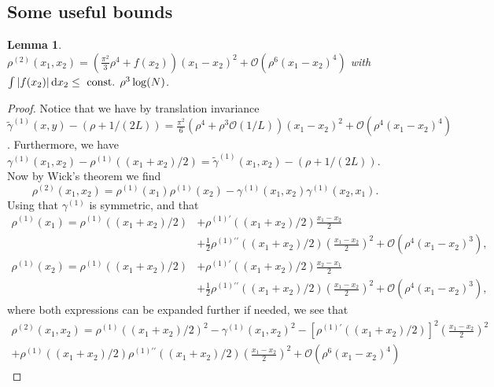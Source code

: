 \documentclass[a4paper,11pt]{article}
\newcommand{\abs}[1]{\left\lvert #1 \right\rvert}
\newcommand*\diff{\mathop{}\!\mathrm{d}}
\newtheorem{lemma}[theorem]{Lemma}
\numberwithin{equation}{section}
\begin{document}
	\subsection{Some useful bounds}
	\begin{lemma}\label{Lemma rho2 bound}
		$ \rho^{(2)}(x_1,x_2)=\left(\frac{\pi^2}{3}\rho^4+f(x_2)\right)(x_1-x_2)^2+\mathcal{O}(\rho^6(x_1-x_2)^4) $ with $ \int \abs{f(x_2)}\diff x_2\leq \textnormal{ const. }\rho^3\log(N) $.
	\end{lemma}
	\begin{proof}
		Notice that we have by translation invariance $ \tilde{\gamma}^{(1)}(x,y)-(\rho+1/(2L))=\frac{\pi^2}{6}(\rho^4+\rho^3\mathcal{O}(1/L))(x_1-x_2)^2+\mathcal{O}(\rho^4(x_1-x_2)^4) $. Furthermore, we have $ \gamma^{(1)}(x_1,x_2)-\rho^{(1)}\left((x_1+x_2)/2\right)=\tilde{\gamma}^{(1)}(x_1,x_2)-(\rho+1/(2L)) $. Now by Wick's theorem we find \begin{equation}
		\rho^{(2)}(x_1,x_2)=\rho^{(1)}(x_1)\rho^{(1)}(x_2)-\gamma^{(1)}(x_1,x_2)\gamma^{(1)}(x_2,x_1).
		\end{equation}
		Using that $ \gamma^{(1)} $ is symmetric, and that \begin{equation}
		\begin{aligned}
		\rho^{(1)}(x_1)=\rho^{(1)}((x_1+x_2)/2)&+\rho^{(1)\prime}((x_1+x_2)/2)\frac{x_1-x_2}{2}\\&+\frac{1}{2}\rho^{(1)\prime\prime}((x_1+x_2)/2)\left(\frac{x_1-x_2}{2}\right)^2+\mathcal{O}(\rho^4(x_1-x_2)^3),
		\end{aligned}
		\end{equation}
		\begin{equation}
		\begin{aligned}
		\rho^{(1)}(x_2)=\rho^{(1)}((x_1+x_2)/2)&+\rho^{(1)\prime}((x_1+x_2)/2)\frac{x_2-x_1}{2}\\&+\frac{1}{2}\rho^{(1)\prime\prime}((x_1+x_2)/2)\left(\frac{x_1-x_2}{2}\right)^2+\mathcal{O}(\rho^4(x_1-x_2)^3),
		\end{aligned}
		\end{equation}
		where both expressions can be expanded further if needed, we see that \begin{equation}
		\begin{aligned}
		\rho^{(2)}(x_1,x_2)=\rho^{(1)}((x_1+x_2)/2)^2-\gamma^{(1)}(x_1,x_2)^2-\left[\rho^{(1)\prime}((x_1+x_2)/2)\right]^2\left(\frac{x_1-x_2}{2}\right)^2\\+\rho^{(1)}((x_1+x_2)/2)\rho^{(1)\prime\prime}((x_1+x_2)/2)\left(\frac{x_1-x_2}{2}\right)^2+\mathcal{O}(\rho^6(x_1-x_2)^4)

\end{aligned}
\end{equation}
\end{proof}
\end{document}
